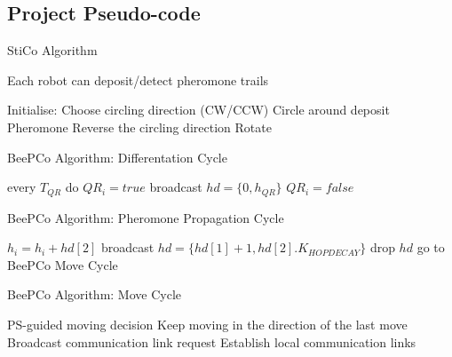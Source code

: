 \clearpage

\subsection{Project Pseudo-code}
\begin{algorithm}
  \caption{StiCo Algorithm\cite{Ranjbar-Sahraei2012Demo} }
  \label{desSysPseuStiCo}
  \begin{algorithmic}[1]
  \Require Each robot can deposit/detect pheromone trails \par
  \State Initialise: Choose circling direction (CW/CCW)
  \Loop
      \State Circle around
      \State deposit Pheromone
    \EndWhile
      \State Reverse the circling direction
    \Else
        \State Rotate
      \EndWhile
    \EndIf
  \EndLoop
  \end{algorithmic}
\end{algorithm}

\begin{algorithm}
  \caption{BeePCo Algorithm\cite{Caliskanelli2015}: Differentation Cycle}
  \label{desSysPseuBeeDiff}
  \begin{algorithmic}[1]
    \State every $ T_{QR} $ do
      \State $ QR_{i} = true $
      \State broadcast $ hd = \{0, h_{QR} \} $
    \Else
      \State $ QR_{i} = false $
    \EndIf
  \end{algorithmic}
\end{algorithm}

\begin{algorithm}
  \caption{BeePCo Algorithm\cite{Caliskanelli2015}: Pheromone Propagation Cycle}
  \label{desSysPseuBeeProp}
  \begin{algorithmic}[1]
        \State $ h_{i} = h_{i} + hd[2] $
        \State broadcast $ hd = \{hd[1] + 1,hd[2].K_{HOPDECAY} \} $
      \Else
        \State drop $ hd $
      \EndIf
      \State go to BeePCo Move Cycle
    \EndWhile
  \end{algorithmic}
\end{algorithm}

\begin{algorithm}
  \caption{BeePCo Algorithm\cite{Caliskanelli2015}: Move Cycle}
  \label{desSysPseuBeeMov}
  \begin{algorithmic}[1]
      \State PS-guided moving decision
    \Else
      \State Keep moving in the direction of the last move
      \State Broadcast communication link request
      \State Establish local communication links
    \EndIf
  \end{algorithmic}
\end{algorithm}

